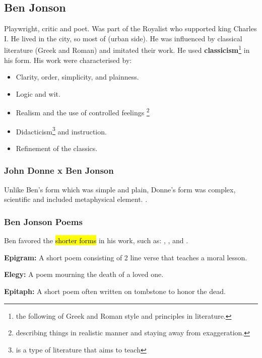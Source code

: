 \documentclass[12pt, a4paper]{article}
\begin{document}
\subsection*{Ben Jonson}

Playwright, critic and poet. Was part of the Royalist who supported 
king Charles I. He lived in the city, 
so most of  (urban side). He was influenced by classical 
literature (Greek and Roman) and imitated their work. He used
\textbf{classicism}\footnote{the following of Greek and Roman style and 
principles in literature.} 
in his form. His work were characterised by:

\begin{itemize}
  \item Clarity, order, simplicity, and plainness.
  \item Logic and wit.
  \item Realism and the use of controlled feelings
    \footnote{describing things in realistic  manner and staying away 
    from exaggeration.}
  \item Didacticism\footnote{is a type of literature that aims to teach}
    and instruction.
  \item Refinement of the classics. 
\end{itemize}

\subsubsection*{John Donne x Ben Jonson}

Unlike Ben's form which was simple and plain, Donne's form was complex, 
scientific and included metaphysical element. .

\subsubsection*{Ben Jonson Poems} 
Ben favored the \hl{shorter forms} in his work, such as: 
, ,  and 
.\medbreak


\textbf{Epigram:} A short poem consisting of 2 line verse that teaches a moral lesson.\medbreak

\textbf{Elegy:} A poem mourning the death of a loved one.\medbreak

\textbf{Epitaph:} A short poem often written on tombstone
to honor the dead.\medbreak
\end{document}

